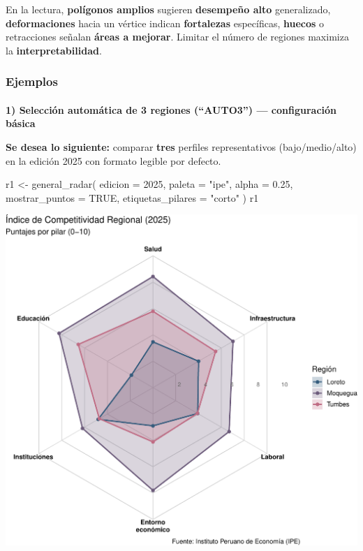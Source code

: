 \documentclass[
  11pt,
  letterpaper,
  DIV=11,
  numbers=noendperiod]{scrartcl}
\makeatletter
\let\oldparagraph\paragraph
\renewcommand{\paragraph}{
    \@ifstar
      \xxxParagraphStar
      \xxxParagraphNoStar
  }
\newcommand{\xxxParagraphStar}[1]{\oldparagraph*{#1}\mbox{}}
\newcommand{\xxxParagraphNoStar}[1]{\oldparagraph{#1}\mbox{}}
\newenvironment{Shaded}{\begin{snugshade}}{\end{snugshade}}
\newcommand{\AttributeTok}[1]{\textcolor[rgb]{0.40,0.45,0.13}{#1}}
\newcommand{\ConstantTok}[1]{\textcolor[rgb]{0.56,0.35,0.01}{#1}}
\newcommand{\DecValTok}[1]{\textcolor[rgb]{0.68,0.00,0.00}{#1}}
\newcommand{\FloatTok}[1]{\textcolor[rgb]{0.68,0.00,0.00}{#1}}
\newcommand{\FunctionTok}[1]{\textcolor[rgb]{0.28,0.35,0.67}{#1}}
\newcommand{\NormalTok}[1]{\textcolor[rgb]{0.00,0.23,0.31}{#1}}
\newcommand{\OtherTok}[1]{\textcolor[rgb]{0.00,0.23,0.31}{#1}}
\newcommand{\StringTok}[1]{\textcolor[rgb]{0.13,0.47,0.30}{#1}}
\makeatother
\begin{document}
En la lectura, \textbf{polígonos amplios} sugieren \textbf{desempeño
alto} generalizado, \textbf{deformaciones} hacia un vértice indican
\textbf{fortalezas} específicas, \textbf{huecos} o retracciones señalan
\textbf{áreas a mejorar}. Limitar el número de regiones maximiza la
\textbf{interpretabilidad}.

\subsubsection{\texorpdfstring{\textbf{Ejemplos}}{Ejemplos}}\label{ejemplos-8}

\paragraph{\texorpdfstring{\textbf{1) Selección automática de 3 regiones
(``AUTO3'') --- configuración
básica}}{1) Selección automática de 3 regiones (``AUTO3'') --- configuración básica}}\label{selecciuxf3n-automuxe1tica-de-3-regiones-auto3-configuraciuxf3n-buxe1sica}

\textbf{Se desea lo siguiente:} comparar \textbf{tres} perfiles
representativos (bajo/medio/alto) en la edición 2025 con formato legible
por defecto.

\begin{Shaded}
\begin{Highlighting}[]
\NormalTok{r1 }\OtherTok{\textless{}{-}} \FunctionTok{general\_radar}\NormalTok{(}
  \AttributeTok{edicion  =} \DecValTok{2025}\NormalTok{,}
  \AttributeTok{paleta   =} \StringTok{"ipe"}\NormalTok{,}
  \AttributeTok{alpha    =} \FloatTok{0.25}\NormalTok{,}
  \AttributeTok{mostrar\_puntos    =} \ConstantTok{TRUE}\NormalTok{,}
  \AttributeTok{etiquetas\_pilares =} \StringTok{"corto"}
\NormalTok{)}
\NormalTok{r1}
\end{Highlighting}
\end{Shaded}

\includegraphics{Manual_files/figure-pdf/unnamed-chunk-52-1.pdf}
\end{document}
